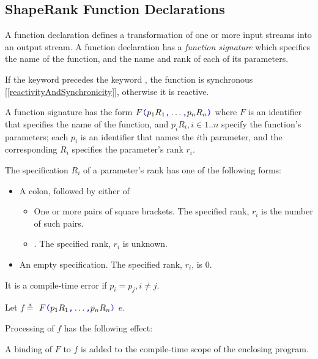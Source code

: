 \documentclass{article}
\begin{document}
\subsection{ShapeRank Function Declarations}
\label{shapeRankFunctionDeclarations}

\FunctionDeclaration

A function declaration defines a transformation of one or more input streams into an output stream. A function declaration has a
{\em function signature} which specifies the name of the function, and the name and rank of each of its parameters.

If the keyword \SYNC precedes the keyword \FUNC, the function is synchronous [\ref{reactivityAndSynchronicity}], otherwise it is reactive.

\FunctionSignature{}

\ParameterList{}

\Parameter{}

\RankSigSuffix{}

\RankSig{}

A function signature has the form  $F\texttt{\color{blue} (}{}p_1 R_1\texttt{\color{blue} ,}{} \ldots\texttt{\color{blue} ,}{} p_n R_n\texttt{\color{blue} )}{}$ where $F$ is an identifier that specifies the name of the function, and $p_i  R_i,  i \in 1..n$ specify the function's parameters; each $p_i$ is an identifier that names the $i$th parameter, and the corresponding $R_i$ specifies the parameter's rank $r_i$.  

The specification $R_i$ of a parameter's rank has one of the following forms:
\begin{itemize}
\item A colon, followed by either of 
\begin{itemize}
\item One or more pairs of square brackets. The specified rank, $r_i$ is the number of such pairs.
\item \QUESTIONMARK{}.  The specified rank, $r_i$ is unknown.
\end{itemize}
\item An empty specification. The specified rank, $r_i$, is 0.
\end{itemize}

It is a compile-time error if $p_i = p_j, i \ne j$.

Let $f \triangleq$ \FUNC{} $F\texttt{\color{blue} (}{}p_1 R_1\texttt{\color{blue} ,}{} \ldots\texttt{\color{blue} ,}{} p_n R_n\texttt{\color{blue} )}{}$  \BIND{} $e$.

Processing of $f$  has the following effect:

A binding of $F$ to $f$ is added to the compile-time scope of the enclosing program.
\end{document}
